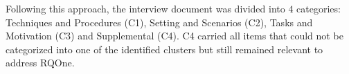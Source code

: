 
Following this approach, the interview document was divided into $4$ categories: Techniques and Procedures (C1), Setting and Scenarios (C2), Tasks and Motivation (C3) and Supplemental (C4). C4 carried all items that could not be categorized into one of the identified clusters but still remained relevant to address \acl{RQOne}.

